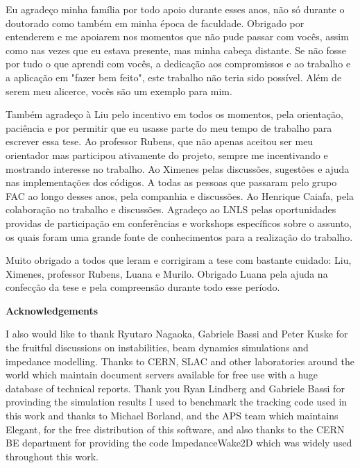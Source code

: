 \begin{agradecimentos}[Agradecimentos]
    Eu agradeço minha família por todo apoio durante esses anos, não só durante o doutorado como também em minha época de faculdade. Obrigado por entenderem e me apoiarem nos momentos que não pude passar com vocês, assim como nas vezes que eu estava presente, mas minha cabeça distante. Se não fosse por tudo o que aprendi com vocês, a dedicação aos compromissos e ao trabalho e a aplicação em "fazer bem feito", este trabalho não teria sido possível. Além de serem meu alicerce, vocês são um exemplo para mim.

    Também agradeço à Liu pelo incentivo em todos os momentos, pela orientação, paciência e por permitir que eu usasse parte do meu tempo de trabalho para escrever essa tese. Ao professor Rubens, que não apenas aceitou ser meu orientador mas participou ativamente do projeto, sempre me incentivando e mostrando interesse no trabalho. Ao Ximenes pelas discussões, sugestões e ajuda nas implementações dos códigos. A todas as pessoas que passaram pelo grupo FAC ao longo desses anos, pela companhia e discussões. Ao Henrique Caiafa, pela colaboração no trabalho e discussões. Agradeço ao LNLS pelas oportunidades providas de participação em conferências e workshops específicos sobre o assunto, os quais foram uma grande fonte de conhecimentos para a realização do trabalho.

    Muito obrigado a todos que leram e corrigiram a tese com bastante cuidado: Liu, Ximenes, professor Rubens, Luana e Murilo. Obrigado Luana pela ajuda na confecção da tese e pela compreensão durante todo esse período.

    \vspace{5mm}
    {\centering \Large \textbf{Acknowledgements}}

    I also would like to thank Ryutaro Nagaoka, Gabriele Bassi and Peter Kuske for the fruitful discussions on instabilities, beam dynamics simulations and impedance modelling. Thanks to CERN, SLAC and other laboratories around the world which maintain document servers available for free use with a huge database of technical reports. Thank you Ryan Lindberg and Gabriele Bassi for provinding the simulation results I used to benchmark the tracking code used in this work and thanks to Michael Borland, and the APS team which maintains Elegant, for the free distribution of this software, and also thanks to the CERN BE department for providing the code ImpedanceWake2D which was widely used throughout this work.
\end{agradecimentos}

